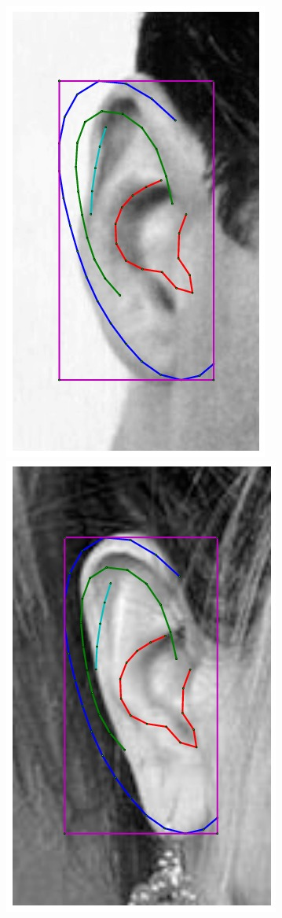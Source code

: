 \begin{figure}[!t]
    \includegraphics[height=\flowh]{resources/Ear_Deformable_Model/fittings/initial_0006}
    \includegraphics[height=\flowh]{resources/Ear_Deformable_Model/fittings/initial_0007}

\end{figure}
